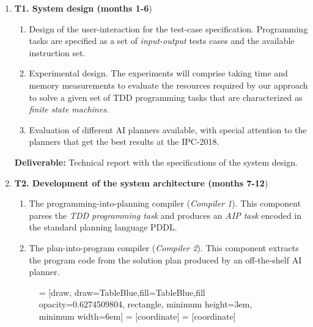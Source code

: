 \documentclass[10pt,a4paper]{paper}
\begin{document}
\begin{enumerate}
\item {\bf T1. System design (months 1-6})
  \begin{small}
    \begin{enumerate}
    \item Design of the user-interaction for the test-case specification. Programming tasks are specified as a set of {\em input-output} tests cases and the available instruction set. 
    \item Experimental design. The experiments will comprise taking time and memory measurements to evaluate the resources required by our approach to solve a given set of TDD programming tasks that are characterized as {\em finite state machines}.
      \item Evaluation of different AI planners available, with special attention to the planners that get the best results at the IPC-2018. 
      \end{enumerate}
  \end{small}

{\small {\bf Deliverable:} Technical report with the specifications of the system design.}
  
  \item {\bf T2. Development of the system architecture (months 7-12})
    \begin{small}
      \begin{enumerate}
      \item The programming-into-planning compiler ({\em Compiler 1}). This component parses the {\em TDD programming task} and produces an {\em AIP task} encoded in the standard planning language PDDL.
      \item The plan-into-program compiler ({\em Compiler 2}). This component extracts the program code from the solution plan produced by an off-the-shelf AI planner.
      \end{enumerate}
\end{small}      


\begin{figure}[hbt!]
 = [draw, draw=TableBlue,fill=TableBlue,fill opacity=0.6274509804, rectangle, minimum height=3em, minimum width=6em]
 = [coordinate]
 = [coordinate]
\begin{center}
\end{center}
\end{figure}
\end{enumerate}
\end{document}
